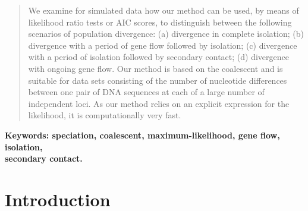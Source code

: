 \documentclass[11pt]{article}
\begin{document}
\begin{abstract}
We examine for simulated data how our method can be used, by means of likelihood ratio tests or AIC scores, to distinguish between the following scenarios of population divergence: (a) divergence in complete isolation; (b) divergence with a period of gene flow followed by isolation; (c) divergence with a period of isolation followed by secondary contact; (d) divergence with ongoing gene flow.
Our method is based on the coalescent and is suitable for data sets consisting of the number of nucleotide differences
between one pair of DNA sequences at each of a large number of independent loci. As our method relies on an explicit expression for
the likelihood, it is computationally very fast.
\end{abstract}

\vspace*{0.1cm}

\noindent
\textbf{\small Keywords: speciation, coalescent, maximum-likelihood, gene flow, isolation, \\secondary contact.}


\section{Introduction}

\end{document}
